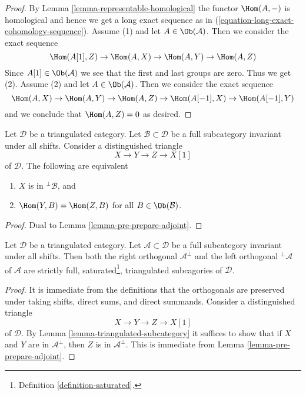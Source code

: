 \begin{proof}
By Lemma \ref{lemma-representable-homological} the functor
$\Hom(A, -)$ is homological and hence we get a long exact sequence
as in (\ref{equation-long-exact-cohomology-sequence}).
Assume (1) and let $A \in \Ob(\mathcal{A})$.
Then we consider the exact sequence
$$
\Hom(A[1], Z) \to \Hom(A, X) \to \Hom(A, Y) \to \Hom(A, Z)
$$
Since $A[1] \in \Ob(\mathcal{A})$
we see that the first and last groups are zero.
Thus we get (2). Assume (2) and let $A \in \Ob(\mathcal{A})$.
Then we consider the exact sequence
$$
\Hom(A, X) \to \Hom(A, Y) \to \Hom(A, Z) \to \Hom(A[-1], X) \to \Hom(A[-1], Y)
$$
and we conclude that $\Hom(A, Z) = 0$ as desired.
\end{proof}

\begin{lemma}
\label{lemma-pre-prepare-adjoint-dual}
Let $\mathcal{D}$ be a triangulated category.
Let $\mathcal{B} \subset \mathcal{D}$
be a full subcategory invariant under all shifts.
Consider a distinguished triangle
$$
X \to Y \to Z \to X[1]
$$
of $\mathcal{D}$. The following are equivalent
\begin{enumerate}
\item $X$ is in ${}^\perp\mathcal{B}$, and
\item $\Hom(Y, B) = \Hom(Z, B)$ for all $B \in \Ob(\mathcal{B})$.
\end{enumerate}
\end{lemma}

\begin{proof}
Dual to Lemma \ref{lemma-pre-prepare-adjoint}.
\end{proof}

\begin{lemma}
\label{lemma-orthogonal-triangulated}
Let $\mathcal{D}$ be a triangulated category. Let
$\mathcal{A} \subset \mathcal{D}$ be a full subcategory invariant
under all shifts. Then both the right orthogonal $\mathcal{A}^\perp$ and
the left orthogonal ${}^\perp\mathcal{A}$ of $\mathcal{A}$
are strictly full, saturated\footnote{Definition \ref{definition-saturated}.},
triangulated subcagories of $\mathcal{D}$.
\end{lemma}

\begin{proof}
It is immediate from the definitions that the orthogonals are preserved
under taking shifts, direct sums, and direct summands.
Consider a distinguished triangle
$$
X \to Y \to Z \to X[1]
$$
of $\mathcal{D}$. By Lemma \ref{lemma-triangulated-subcategory} it
suffices to show that if $X$ and $Y$ are in $\mathcal{A}^\perp$, then
$Z$ is in $\mathcal{A}^\perp$. This is immediate from
Lemma \ref{lemma-pre-prepare-adjoint}.
\end{proof}

